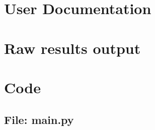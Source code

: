 \documentclass[11pt,openright,twoside,a4paper]{report}
\begin{document}
\chapter{User Documentation}

\chapter{Raw results output}

\chapter{Code}


\begin{landscape}
\begin{multicols}{2}
\section{File: main.py}

\end{multicols}
\end{landscape}
\end{document}
